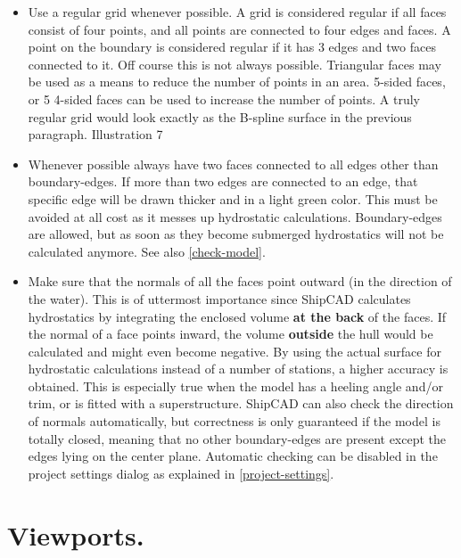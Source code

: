 \documentclass[12pt]{article}
\begin{document}
\begin{itemize}

  \item Use a regular grid whenever possible. A grid is considered
regular if all faces consist of four points, and all points are
connected to four edges and faces. A point on the boundary is
considered regular if it has 3 edges and two faces connected to
it. Off course this is not always possible.  Triangular faces may be
used as a means to reduce the number of points in an area.  5-sided
faces, or 5 4-sided faces can be used to increase the number of
points. A truly regular grid would look exactly as the B-spline
surface in the previous paragraph.
Illustration 7

  \item Whenever possible always have two faces connected to all edges
other than boundary-edges. If more than two edges are connected to an
edge, that specific edge will be drawn thicker and in a light green
color. This must be avoided at all cost as it messes up hydrostatic
calculations. Boundary-edges are allowed, but as soon as they become
submerged hydrostatics will not be calculated anymore. See also \ref{check-model}.

  \item Make sure that the normals of all the faces point outward (in
the direction of the water). This is of uttermost importance since
ShipCAD calculates hydrostatics by integrating the enclosed
volume \textbf{at the back} of the faces. If the normal of a face
points inward, the volume \textbf{outside} the hull would be
calculated and might even become negative. By using the actual surface
for hydrostatic calculations instead of a number of stations, a higher
accuracy is obtained. This is especially true when the model has a
heeling angle and/or trim, or is fitted with a superstructure. ShipCAD
can also check the direction of normals automatically, but correctness
is only guaranteed if the model is totally closed, meaning that no
other boundary-edges are present except the edges lying on the center
plane. Automatic checking can be disabled in the project settings
dialog as explained in \ref{project-settings}.

\end{itemize}

\section{Viewports.}
\end{document}
